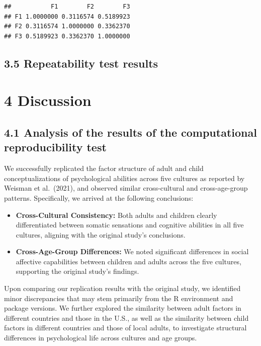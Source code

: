 \documentclass[
  man]{apa6}
\providecommand{\tightlist}{%
  \setlength{\itemsep}{0pt}\setlength{\parskip}{0pt}}
\begin{document}
\begin{verbatim}
##           F1        F2        F3
## F1 1.0000000 0.3116574 0.5189923
## F2 0.3116574 1.0000000 0.3362370
## F3 0.5189923 0.3362370 1.0000000
\end{verbatim}

\hypertarget{repeatability-test-results}{%
\subsection{3.5 Repeatability test results}\label{repeatability-test-results}}

\hypertarget{discussion}{%
\section{4 Discussion}\label{discussion}}

\hypertarget{analysis-of-the-results-of-the-computational-reproducibility-test}{%
\subsection{4.1 Analysis of the results of the computational reproducibility test}\label{analysis-of-the-results-of-the-computational-reproducibility-test}}

We successfully replicated the factor structure of adult and child conceptualizations of psychological abilities across five cultures as reported by Weisman et al.~(2021), and observed similar cross-cultural and cross-age-group patterns. Specifically, we arrived at the following conclusions:

\begin{itemize}
\tightlist
\item
  \textbf{Cross-Cultural Consistency:} Both adults and children clearly differentiated between somatic sensations and cognitive abilities in all five cultures, aligning with the original study's conclusions.
\item
  \textbf{Cross-Age-Group Differences:} We noted significant differences in social affective capabilities between children and adults across the five cultures, supporting the original study's findings.
\end{itemize}

Upon comparing our replication results with the original study, we identified minor discrepancies that may stem primarily from the R environment and package versions. We further explored the similarity between adult factors in different countries and those in the U.S., as well as the similarity between child factors in different countries and those of local adults, to investigate structural differences in psychological life across cultures and age groups.
\end{document}
